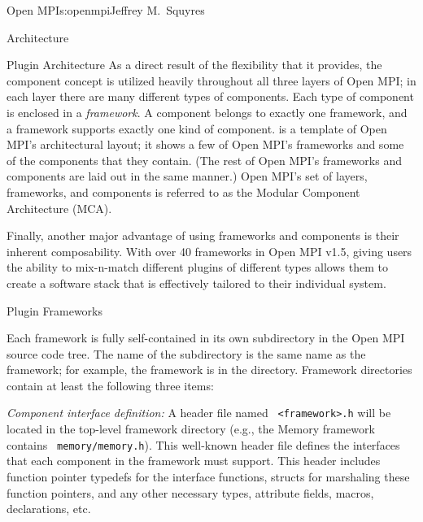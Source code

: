 \begin{aosachapter}{Open MPI}{s:openmpi}{Jeffrey M.\ Squyres}
\begin{aosasect1}{Architecture}
\begin{aosasect2}{Plugin Architecture}
As a direct result of the flexibility that it provides, the component
concept is utilized heavily throughout all three layers of Open MPI;
in each layer there are many different types of components.
%
Each type of component is enclosed in a \emph{framework}.
%
A component belongs to exactly one framework, and a framework supports
exactly one kind of component.
%
 is a template of Open MPI's architectural
layout; it shows a few of Open MPI's frameworks and some of the
components that they contain.  (The rest of Open MPI's frameworks and
components are laid out in the same manner.)
%
Open MPI's set of layers, frameworks, and components is referred to as
the Modular Component Architecture (MCA).


Finally, another major advantage of using frameworks and components is
their inherent composability.  With over 40 frameworks in Open MPI
v1.5, giving users the ability to mix-n-match different plugins of
different types allows them to create a software stack that is
effectively tailored to their individual system.

\end{aosasect2}


\begin{aosasect2}{Plugin Frameworks}

Each framework is fully self-contained in its own subdirectory in the
Open MPI source code tree.  The name of the subdirectory is the same
name as the framework; for example, the  framework is in
the  directory.  
%
Framework directories contain at least the following three items:

\begin{aosaenumerate}
\item \emph{Component interface definition:} A header file named {\tt
    <framework>.h} will be located in the top-level framework
  directory (e.g., the Memory framework contains {\tt
    memory/memory.h}).  This well-known header file defines the
  interfaces that each component in the framework must support.  This
  header includes function pointer typedefs for the interface
  functions, structs for marshaling these function pointers, and any
  other necessary types, attribute fields, macros, declarations, etc.


\end{aosaenumerate}
\end{aosasect2}
\end{aosasect1}
\end{aosachapter}
